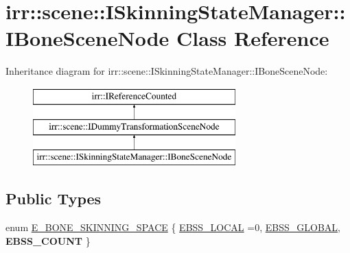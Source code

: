 \hypertarget{classirr_1_1scene_1_1ISkinningStateManager_1_1IBoneSceneNode}{}\section{irr\+:\+:scene\+:\+:I\+Skinning\+State\+Manager\+:\+:I\+Bone\+Scene\+Node Class Reference}
\label{classirr_1_1scene_1_1ISkinningStateManager_1_1IBoneSceneNode}
Inheritance diagram for irr\+:\+:scene\+:\+:I\+Skinning\+State\+Manager\+:\+:I\+Bone\+Scene\+Node\+:\begin{figure}[H]
\begin{center}
\leavevmode
\includegraphics[height=3.000000cm]{classirr_1_1scene_1_1ISkinningStateManager_1_1IBoneSceneNode}
\end{center}
\end{figure}
\subsection*{Public Types}
\begin{DoxyCompactItemize}
\item 
enum \hyperlink{classirr_1_1scene_1_1ISkinningStateManager_1_1IBoneSceneNode_a746e46bb30372063ca11a4695fd345bd}{E\+\_\+\+B\+O\+N\+E\+\_\+\+S\+K\+I\+N\+N\+I\+N\+G\+\_\+\+S\+P\+A\+CE} \{ \hyperlink{classirr_1_1scene_1_1ISkinningStateManager_1_1IBoneSceneNode_a746e46bb30372063ca11a4695fd345bda80eee20d1f6a106998a7c97378126398}{E\+B\+S\+S\+\_\+\+L\+O\+C\+AL} =0, 
\hyperlink{classirr_1_1scene_1_1ISkinningStateManager_1_1IBoneSceneNode_a746e46bb30372063ca11a4695fd345bda3408d599f51f779ffae4dce7908c3f69}{E\+B\+S\+S\+\_\+\+G\+L\+O\+B\+AL}, 
{\bfseries E\+B\+S\+S\+\_\+\+C\+O\+U\+NT}
 \}
\end{DoxyCompactItemize}
